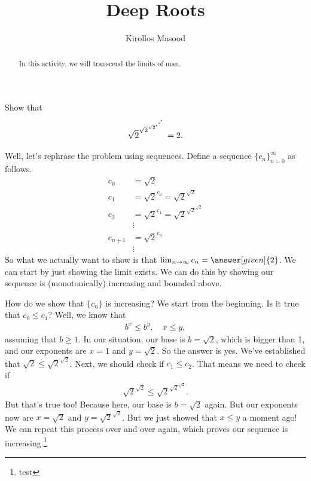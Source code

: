 \documentclass{ximera}
\title{Deep Roots}
\author{Kirollos Masood}
\begin{document}
\begin{abstract}
In this activity, we will transcend the limits of man.
\end{abstract}
\maketitle

\begin{exercise}
	Show that
	\begin{align*}
		\sqrt{2}^{\sqrt{2}^{\sqrt{2}^{\rotatebox{45}{\ldots}}  }}=2.
	\end{align*}
	
	Well, let's rephrase the problem using sequences. Define a sequence $\{c_n\}_{n=0}^{\infty}$ as follows.
	\begin{align*}
		c_0 &=\sqrt{2} \\
		c_1 &=\sqrt{2}^{c_0}=\sqrt{2}^{\sqrt{2}} \\
		c_2 &=\sqrt{2}^{c_1}=\sqrt{2}^{\sqrt{2}^{\sqrt{2}}} \\
		&\vdots \\
		c_{n+1}&=\sqrt{2}^{c_n} \\
		&\vdots
	\end{align*}
	So what we actually want to show is that $\lim_{n \to \infty} c_n = \answer[given]{2}$. We can start by just showing the limit exists. We can do this by showing our sequence is (monotonically) increasing and bounded above.
	
	How do we show that $\{c_n\}$ is increasing? We start from the beginning. Is it true that $c_0 \leq c_1$? Well, we know that
	\begin{align*}
		b^x \leq b^y, \quad x \leq y,
	\end{align*}
	assuming that $b \geq 1$. In our situation, our base is $b=\sqrt{2}$, which is bigger than 1, and our exponents are $x=1$ and $y=\sqrt{2}$. So the answer is yes. We've established that $\sqrt{2} \leq \sqrt{2}^{\sqrt{2}}$. Next, we should check if $c_1 \leq c_2$. That means we need to check if 
	\begin{align*}
		\sqrt{2}^{\sqrt{2}} \leq \sqrt{2}^{\sqrt{2}^{\sqrt{2}}}.
	\end{align*}
	But that's true too! Because here, our base is $b=\sqrt{2}$ again. But our exponents now are $x=\sqrt{2}$ and $y=\sqrt{2}^{\sqrt{2}}$. But we just showed that $x\leq y$ a moment ago! We can repeat this process over and over again, which proves our sequence is increasing.\footnote{test}
	
	
	
	
	
\end{exercise}
\end{document}
